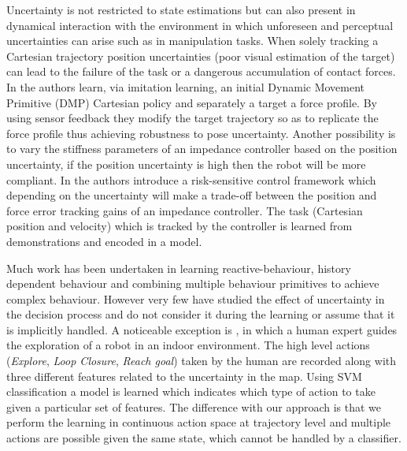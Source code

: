 Uncertainty is not restricted to state estimations but can also present in dynamical interaction with the environment in which 
unforeseen and perceptual uncertainties can arise such as in manipulation tasks. When solely tracking a Cartesian trajectory 
position uncertainties (poor visual estimation of the target) can lead to the failure of the task or a dangerous accumulation 
of contact forces. In \cite{online_pre_sensor_2011} the authors learn, via imitation learning, an initial 
Dynamic Movement Primitive (DMP) Cartesian policy and separately a target a force profile. By using sensor feedback they 
modify the target trajectory so as to replicate the force profile thus achieving robustness to pose uncertainty. Another possibility
is to vary the stiffness parameters of an impedance controller \cite{Klas_icra_2012} based on the position uncertainty, 
if the position uncertainty is high then the robot will be more compliant. In \cite{MedinaSH13} the authors introduce a 
risk-sensitive control framework which depending on the uncertainty will make a trade-off between the position and force error tracking gains
of an impedance controller. The task (Cartesian position and velocity) which is tracked by the controller is learned from demonstrations and encoded in 
a model.




Much work has been undertaken in learning reactive-behaviour, history dependent behaviour and combining multiple behaviour primitives to achieve
complex behaviour. However very few have studied the effect of uncertainty in the decision process and 
do not consider it during the learning or assume that it is implicitly handled.
A noticeable exception is \cite{GeorgiosLidoris}, in which a human expert guides the exploration of a robot in an indoor environment. 
The high level actions (\textit{Explore}, \textit{Loop Closure}, \textit{Reach goal}) taken by the human are recorded along with three different features related to the uncertainty in the map. 
Using SVM classification a model is learned which indicates which type of action to take given a particular set of 
features. The difference with our approach is that we perform 
the learning in continuous action space at trajectory level and multiple actions are possible given the same state, which cannot be handled by a classifier.

